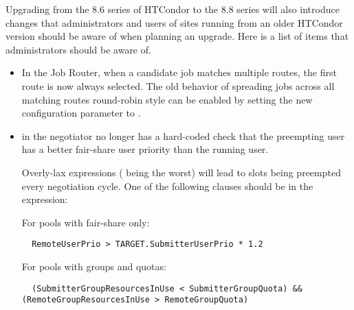 Upgrading from the 8.6 series of HTCondor to the 8.8 series will
also introduce changes that administrators and users of sites running
from an older HTCondor version should be aware of when planning an upgrade.
Here is a list of items that administrators should be aware of.

\begin{itemize}

\item In the Job Router, when a candidate job matches multiple routes,
the first route is now always selected.
The old behavior of spreading jobs across all matching routes round-robin
style can be enabled by setting the new configuration parameter
 to .

\item {} in the negotiator no longer has a hard-coded
check that the preempting user has a better fair-share user priority
than the running user.

Overly-lax expressions ( being the worst) will lead to slots
being preempted every negotiation cycle.
One of the following clauses should be in the expression:

For pools with fair-share only:
\begin{verbatim}
  RemoteUserPrio > TARGET.SubmitterUserPrio * 1.2
\end{verbatim}

For pools with groups and quotas:
\begin{verbatim}
  (SubmitterGroupResourcesInUse < SubmitterGroupQuota) && (RemoteGroupResourcesInUse > RemoteGroupQuota)
\end{verbatim}

\end{itemize}
